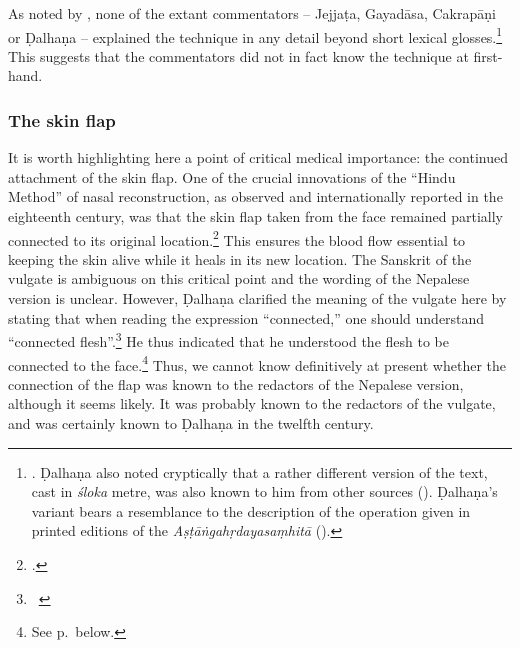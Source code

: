 As noted by \citeauthor{meul-hist}, none of the extant commentators -- Jejjaṭa,
Gayadāsa, Cakrapāṇi or Ḍalhaṇa -- explained the technique in any detail beyond short
lexical glosses.\footnote{\cite[IB, 328]{meul-hist}. Ḍalhaṇa also noted
cryptically that a rather different version of the text, cast in \emph{śloka}
metre, was also known to him from other sources (). 
Ḍalhaṇa's variant bears a resemblance to the description of the operation given in
printed editions of the \emph{Aṣṭāṅgahṛdayasaṃhitā} 
().}
This suggests that the commentators did not in fact know the technique at
first-hand.

\subsubsection{The skin flap} It is worth highlighting here a point of critical
medical importance: the continued attachment of the skin flap. One of the crucial
innovations of the “Hindu Method” of nasal reconstruction, as observed  and
internationally reported in the eighteenth century, was that the skin flap taken
from the face remained partially connected to its original
location.\footcite[See][67--70]{wuja-2003} This ensures the blood flow essential
to keeping the skin alive while it heals in its new location.  The Sanskrit of the
vulgate is ambiguous on this critical point and the wording of the Nepalese
version is unclear. However, Ḍalhaṇa clarified the meaning of the vulgate here by
stating that when reading the expression “connected,” one should understand
“connected flesh”.\footnote{\SS\ }  He thus indicated that he
    understood the flesh to be connected to the face.\footnote{See
        p.\,\pageref{well-joined} below.}  Thus, we cannot know definitively at present
        whether the connection of the flap was known to the redactors of the Nepalese
        version, although it seems likely.  It was probably known to the redactors of the
        vulgate, and was certainly known to Ḍalhaṇa in the twelfth century.
        
